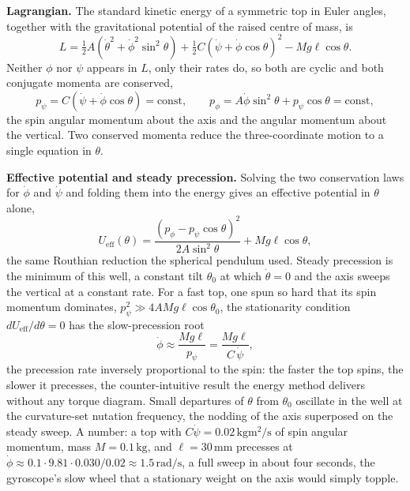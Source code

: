 \textbf{Lagrangian.} The standard kinetic energy of a symmetric top in Euler
angles, together with the gravitational potential of the raised centre of
mass, is
\[
L = \tfrac12 A(\dot\theta^2 + \dot\phi^2\sin^2\theta)
  + \tfrac12 C(\dot\psi + \dot\phi\cos\theta)^2
  - Mg\ell\cos\theta.
\]
Neither $\phi$ nor $\psi$ appears in $L$, only their rates do, so both are
cyclic and both conjugate momenta are conserved,
\[
p_\psi = C(\dot\psi + \dot\phi\cos\theta) = \text{const},
\qquad
p_\phi = A\dot\phi\sin^2\theta + p_\psi\cos\theta = \text{const},
\]
the spin angular momentum about the axis and the angular momentum about the
vertical. Two conserved momenta reduce the three-coordinate motion to a
single equation in $\theta$.

\textbf{Effective potential and steady precession.} Solving the two
conservation laws for $\dot\phi$ and $\dot\psi$ and folding them into the
energy gives an effective potential in $\theta$ alone,
\[
U_{\mathrm{eff}}(\theta)
= \frac{(p_\phi - p_\psi\cos\theta)^2}{2A\sin^2\theta}
  + Mg\ell\cos\theta,
\]
the same Routhian reduction the spherical pendulum used. Steady precession
is the minimum of this well, a constant tilt $\theta_0$ at which
$\dot\theta = 0$ and the axis sweeps the vertical at a constant rate. For a
fast top, one spun so hard that its spin momentum dominates, $p_\psi^2 \gg
4AMg\ell\cos\theta_0$, the stationarity condition $dU_{\mathrm{eff}}/d\theta
= 0$ has the slow-precession root
\[
\dot\phi \approx \frac{Mg\ell}{p_\psi} = \frac{Mg\ell}{C\,\dot\psi},
\]
the precession rate inversely proportional to the spin: the faster the top
spins, the slower it precesses, the counter-intuitive result the energy
method delivers without any torque diagram. Small departures of $\theta$
from $\theta_0$ oscillate in the well at the curvature-set nutation
frequency, the nodding of the axis superposed on the steady sweep. A
number: a top with $C\dot\psi = 0.02\,\si{\kilogram\meter\squared\per
\second}$ of spin angular momentum, mass $M = 0.1\,\si{\kilogram}$, and
$\ell = 30\,\si{\milli\meter}$ precesses at $\dot\phi \approx 0.1\cdot 9.81
\cdot 0.030/0.02 \approx 1.5\,\si{\radian\per\second}$, a full sweep in
about four seconds, the gyroscope's slow wheel that a stationary weight on
the axis would simply topple.


